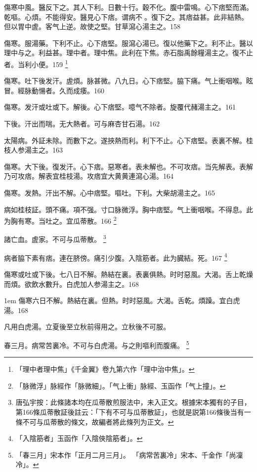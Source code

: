 傷寒中風。醫反下之。其人下利。日數十行。穀不化。腹中雷鳴。心下痞堅而滿。乾嘔。心煩。不{\khaaitp 能}得安。醫見心下痞。谓病不{\sungtpii 𥁞}。復下之。其痞益甚。此非結熱。但以胃中虗。客气上逆。故使之堅。甘草瀉心湯主之。158

傷寒。服湯藥。下利不止。心下痞堅。服瀉心湯已。復以他藥下之。利不止。醫以理中与之。利益甚。理中者。理中焦。此利在下焦。赤石脂禹餘糧湯主之。復不止者。当利小便。159
	\footnote{
		「理中者理中焦」《千金翼》卷九第六作「理中治中焦」。
	}

傷寒。吐下{\khaaitp 後}发汗。虗煩。脉甚微。八九日。心下痞堅。脇下痛。气上衝咽喉。眩冒。經脉動愓者。久而成痿。160

傷寒。发汗{\khaaitp 或}吐{\khaaitp 或}下。解後。心下痞堅。噫气不除者。旋覆代赭湯主之。161

下後。汗出而喘。无大熱者。可与麻杏甘石湯。162

太陽病。外証未除。而數下之。遂挾熱而利。利下不止。心下痞堅。表裏不解。桂枝人参湯主之。163

傷寒。大下後。復发汗。心下痞。惡寒者。表未解也。不可攻痞。当先解表。表解乃可攻痞。解表宜桂枝湯。攻痞宜大黄黄連瀉心湯。164

傷寒。发熱。汗出不解。心中痞堅。嘔吐。下利。大柴胡湯主之。165

病如桂枝証。頭不痛。項不强。寸{\khaaitp 口}脉微浮。胸中痞堅。气上衝咽喉。不得息。此为胸有寒。当吐之。宜瓜蒂散。166
	\footnote{「脉微浮」脉經作「脉微細」。「气上衝」脉經、玉函作「气上撞」。}

諸亡血。虗家。不可与瓜蒂散。
	\footnote{
		唐弘宇按：此條諸本均在瓜蒂散煎服法中，未入正文。根據宋本獨有的子目，第166條瓜蒂散証後註云：「下有不可与瓜蒂散証」，也就是説第166條後当有一條不可与瓜蒂散的條文，故編者將此條列为正文。
	}

病者脇下素有痞。連在脐傍。痛引少腹。入陰筋者。此为臓結。死。167
	\footnote{「入陰筋者」玉函作「入陰俠陰筋者」。}

傷寒或吐或下後。七八日不解。熱結在裏。表裏俱熱。时时惡風。大渴。舌上乾燥而煩。欲飲水數升。白虎{\khaaitp 加人参}湯主之。168

\hangindent 1em
傷寒六日不解。熱結在裏。但熱。时时惡風。大渴。舌乾。煩躁。宜白虎湯。{\gaoben}168

凡用白虎湯。立夏後至立秋前得用之。立秋後不可服。

春三月。病常苦裏冷。不可与白虎湯。与之則嘔利而腹痛。
	\footnote{
		「春三月」宋本作「正月二月三月」。
		「病常苦裏冷」宋本、千金作「尚凜冷」。
	}

